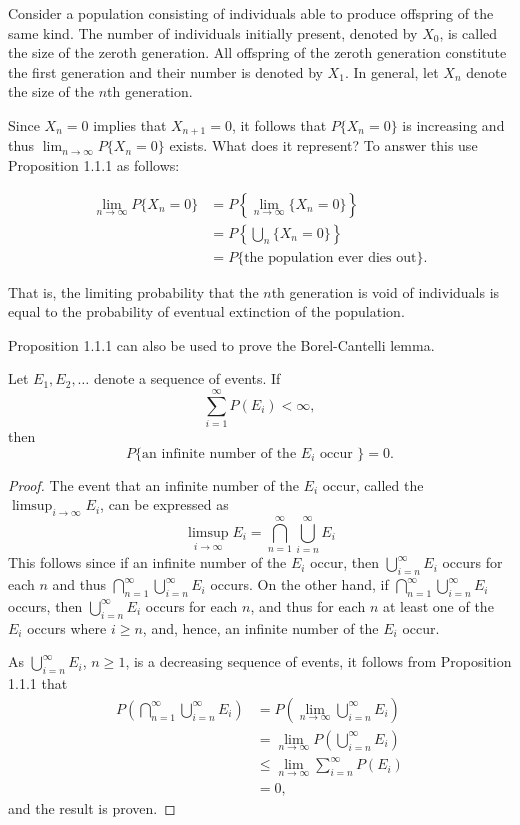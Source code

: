 \documentclass[lang=cn,10pt,thmcnt=section]{elegantbook}
\begin{document}
\begin{example}
	Consider a population consisting of individuals able to produce offspring of the same kind. The number of individuals initially present, denoted by \(X_0\), is called the size of the zeroth generation. All offspring of the zeroth generation constitute the first generation and their number is denoted by \(X_1\). In general, let \(X_n\) denote the size of the \(n\)th generation.

Since \(X_n = 0\) implies that \(X_{n+1} = 0\), it follows that \(P\{X_n = 0\}\) is increasing and thus \(\lim_{n \to \infty} P\{X_n = 0\}\) exists. What does it represent? To answer this use Proposition 1.1.1 as follows:

\[
\begin{aligned}
\lim_{n \to \infty} P\{X_n = 0\} &= P\left\{\lim_{n \to \infty} \{X_n = 0\}\right\} \\
&= P\left\{\bigcup_n \{X_n = 0\}\right\} \\
&= P\{\text{the population ever dies out}\}.
\end{aligned}
\]

That is, the limiting probability that the \(n\)th generation is void of individuals is equal to the probability of eventual extinction of the population.
\end{example}
Proposition 1.1.1 can also be used to prove the Borel-Cantelli lemma.
\begin{proposition}
	Let \(E_1, E_2, \ldots\) denote a sequence of events. If
\[
\sum_{i=1}^{\infty} P(E_i) < \infty,
\]
then
\[
P\{\text{an infinite number of the } E_i \text{ occur }\} = 0.
\]

\end{proposition}
\begin{proof}
	The event that an infinite number of the \(E_i\) occur, called the \(\limsup_{i \to \infty} E_i\), can be expressed as
	\[
	\limsup_{i \to \infty} E_i = \bigcap_{n=1}^{\infty} \bigcup_{i=n}^{\infty} E_i
	\]
	This follows since if an infinite number of the \(E_i\) occur, then \(\bigcup_{i=n}^{\infty} E_i\) occurs for each \(n\) and thus \(\bigcap_{n=1}^{\infty} \bigcup_{i=n}^{\infty} E_i\) occurs. On the other hand, if \(\bigcap_{n=1}^{\infty} \bigcup_{i=n}^{\infty} E_i\) occurs, then \(\bigcup_{i=n}^{\infty} E_i\) occurs for each \(n\), and thus for each \(n\) at least one of the \(E_i\) occurs where \(i \geq n\), and, hence, an infinite number of the \(E_i\) occur.
	
	As \(\bigcup_{i=n}^{\infty} E_i\), \(n \geq 1\), is a decreasing sequence of events, it follows from Proposition 1.1.1 that
	\begin{align*}
	P\left( \bigcap_{n=1}^{\infty} \bigcup_{i=n}^{\infty} E_i \right) &= P\left( \lim_{n \to \infty} \bigcup_{i=n}^{\infty} E_i \right) \\
	&= \lim_{n \to \infty} P\left( \bigcup_{i=n}^{\infty} E_i \right) \\
	&\leq \lim_{n \to \infty} \sum_{i=n}^{\infty} P(E_i) \\
	&= 0,
	\end{align*}
	and the result is proven.
\end{proof}
\end{document}
